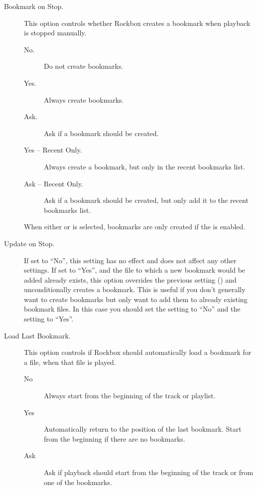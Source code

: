   \begin{description}

  \item [Bookmark on Stop.]
    This option controls whether Rockbox creates a bookmark when playback is
    stopped manually.
    \begin{description}
      \item[No.]
            Do not create bookmarks.
      \item[Yes.]
            Always create bookmarks.
      \item[Ask.]
            Ask if a bookmark should be created.
      \item[Yes -- Recent Only.]
            Always create a bookmark, but only in the recent bookmarks list.
      \item[Ask -- Recent Only.]
            Ask if a bookmark should be created, but only add it to the recent
            bookmarks list.
    \end{description}
    When either  or 
    is selected, bookmarks are only created if the  is enabled.
    
  \item [Update on Stop.]
    If set to ``No'', this setting has no effect and does not affect any other settings.
    If set to ``Yes'', and the file
    to which a new bookmark would be added already exists, this option overrides
    the previous setting () and unconditionally creates a
    bookmark. This is useful if you don't generally want to create bookmarks but
    only want to add them to already existing bookmark files. In this case you
    should set the setting  to ``No'' and the setting
     to ``Yes''.

  \item [Load Last Bookmark.]
    This option controls if Rockbox should automatically load a bookmark for
    a file, when that file is played.
    
    \begin{description}
      \item[No]
            Always start from the beginning of the track or playlist.
      \item[Yes]
            Automatically return to the position of the last bookmark. Start
            from the beginning if there are no bookmarks.
      \item[Ask]
            Ask if playback should start from the beginning of the track or
            from one of the bookmarks.
    \end{description}


\end{description}
